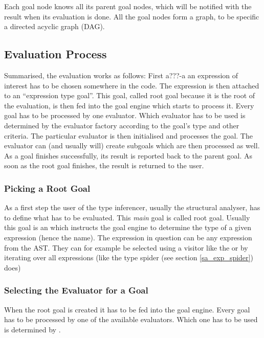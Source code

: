 \documentclass[12pt,halfparskip,DIV11,BCOR10mm]{scrreprt}
\begin{document}
Each goal node knows all its parent goal nodes, which will be notified with the result when its evaluation is done. All the goal nodes form a graph, to be specific a directed acyclic graph (DAG).

\subsection{Evaluation Process}

Summarised, the evaluation works as follows: First a???-a an expression of interest has to be chosen somewhere in the code. The expression is then attached to an ``expression type goal''. This goal, called root goal because it is the root of the evaluation, is then fed into the goal engine which starts to process it. Every goal has to be processed by one evaluator. Which evaluator has to be used is determined by the evaluator factory according to the goal's type and other criteria. The particular evaluator is then initialised and processes the goal. The evaluator can (and usually will) create subgoals which are then processed as well. As a goal finishes successfully, its result is reported back to the parent goal. As soon as the root goal finishes, the result is returned to the user.

\subsubsection{Picking a Root Goal}

As a first step the user of the type inferencer, usually the structural analyser, has to define what has to be evaluated. This \emph{main} goal is called root goal. Usually this goal is an  which instructs the goal engine to determine the type of a given expression (hence the name). The expression in question can be any expression from the AST. They can for example be selected using a visitor like the  or by iterating over all expressions (like the type spider (see section \vref{sa_exp_spider}) does)

\subsubsection{Selecting the Evaluator for a Goal}

When the root goal is created it has to be fed into the goal engine. Every goal has to be processed by one of the available evaluators. Which one has to be used is determined by .
\end{document}
